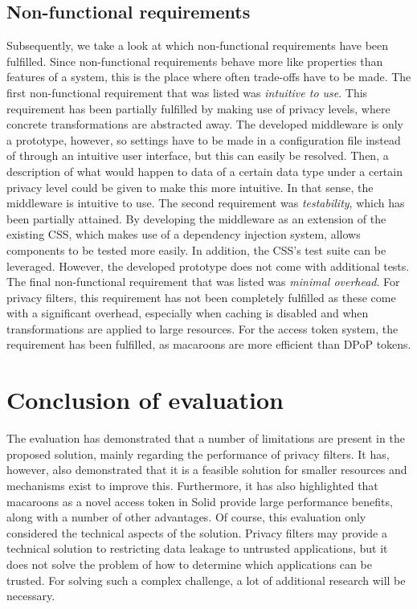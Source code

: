 \subsection{Non-functional requirements}
Subsequently, we take a look at which non-functional requirements have been fulfilled. Since non-functional requirements behave more like properties than features of a system, this is the place where often trade-offs have to be made. The first non-functional requirement that was listed was \textit{intuitive to use}. This requirement has been partially fulfilled by making use of privacy levels, where concrete transformations are abstracted away. The developed middleware is only a prototype, however, so settings have to be made in a configuration file instead of through an intuitive user interface, but this can easily be resolved. Then, a description of what would happen to data of a certain data type under a certain privacy level could be given to make this more intuitive. In that sense, the middleware is intuitive to use. The second requirement was \textit{testability}, which has been partially attained. By developing the middleware as an extension of the existing \gls{CSS}, which makes use of a dependency injection system, allows components to be tested more easily. In addition, the \gls{CSS}'s test suite can be leveraged. However, the developed prototype does not come with additional tests. The final non-functional requirement that was listed was \textit{minimal overhead}. For privacy filters, this requirement has not been completely fulfilled as these come with a significant overhead, especially when caching is disabled and when transformations are applied to large resources. For the access token system, the requirement has been fulfilled, as macaroons are more efficient than \gls{DPoP} tokens.


\section{Conclusion of evaluation}
The evaluation has demonstrated that a number of limitations are present in the proposed solution, mainly regarding the performance of privacy filters. It has, however, also demonstrated that it is a feasible solution for smaller resources and mechanisms exist to improve this. Furthermore, it has also highlighted that macaroons as a novel access token in Solid provide large performance benefits, along with a number of other advantages. Of course, this evaluation only considered the technical aspects of the solution. Privacy filters may provide a technical solution to restricting data leakage to untrusted applications, but it does not solve the problem of how to determine which applications can be trusted. For solving such a complex challenge, a lot of additional research will be necessary. 
